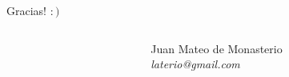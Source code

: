 \documentclass{beamer}
\begin{document}

%
%
%
%
%
%
%



\begin{frame}{Gracias! $:)$}
	\begin{columns}
		\begin{column}{0.20 \textwidth}
		\end{column}
		\begin{column}{0.55 \textwidth}
				\center
				Juan Mateo de Monasterio \\
				\textit{laterio@gmail.com} \\
		\end{column}
	\end{columns}
\end{frame}


\justifying%





\vfill
\end{document}
